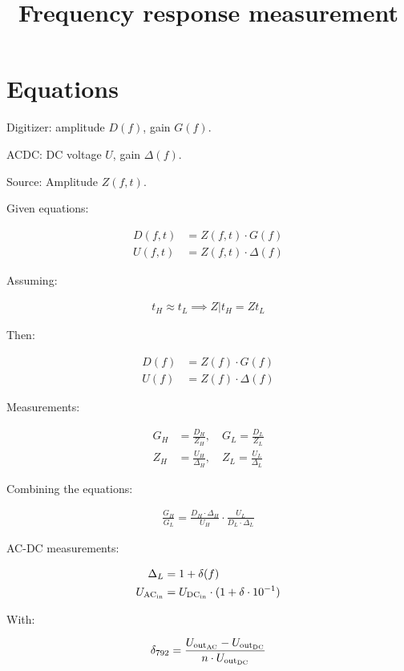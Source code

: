 \documentclass{article}
\title{Frequency response measurement}
\begin{document}
\maketitle

\section*{Equations}
Digitizer: amplitude $D(f)$, gain $G(f)$.

ACDC: DC voltage $U$, gain $\Delta(f)$.

Source: Amplitude $Z(f,t)$.

Given equations:

\begin{align}
	D(f, t) & = Z(f, t) \cdot G(f)      \\
	U(f, t) & = Z(f, t) \cdot \Delta(f)
\end{align}

Assuming:

\begin{align}
	t_H \approx t_L \implies Z\big|{t_H} = Z{t_L}
\end{align}

Then:

\begin{align}
	D(f) & = Z(f) \cdot G(f)      \\
	U(f) & = Z(f) \cdot \Delta(f)
\end{align}

Measurements:

\begin{align}
	G_H & = \frac{D_H}{Z_H}, \quad G_L = \frac{D_L}{Z_L}           \\
	Z_H & = \frac{U_H}{\Delta_H}, \quad Z_L = \frac{U_L}{\Delta_L}
\end{align}

Combining the equations:

\begin{align}
	\frac{G_H}{G_L} = \frac{D_H \cdot \Delta_H}{U_H} \cdot \frac{U_L}{D_L \cdot \Delta_L}
\end{align}

\textcolor{red}{}

AC-DC measurements:

\begin{align}
	\Delta_L        & = 1 + \delta(f)                                    \\
	U_{\rm AC_{in}} & = U_{\rm DC_{in}} \cdot (1 + \delta \cdot 10^{-1})
\end{align}

With:

\begin{align}
	\delta_{792} = \frac{U_{\rm out_{AC}} - U_{\rm out_{DC}}}{n\cdot U_{\rm out_{DC}}}
\end{align}
\end{document}
